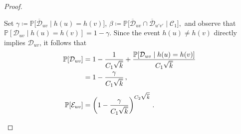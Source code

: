 \documentclass[journal]{IEEEtran}
\theoremstyle{definition}
\theoremstyle{definition}
\newcommand{\Dc}{\mathcal{D}}
\newcommand{\Ec}{\mathcal{E}}
\newcommand{\PP}{\mathbb{P}}
\newcommand{\kb}{\overline{k}}
\newcommand{\barD}{\overline{\mathcal{D}}}
\begin{document}
\begin{proof}
\begin{enumerate}
        Set $\gamma \coloneqq \PP\bigl[\barD_{uv} \mid h(u) = h(v)\bigr]$, $\beta \coloneqq \PP\bigl[\barD_{uv} \cap \barD_{u'v'} \mid \mathcal{C}_1\bigr],$
and observe that $\PP[\Dc_{uv} \mid h(u) = h(v)] = 1 - \gamma$.
        Since the event $h(u) \ne h(v)$ directly implies $\Dc_{uv}$, it follows that
\begin{align}
    \PP[\Dc_{uv}] 
    &= 1 - \frac{1}{C_1 \sqrt{\kb}} 
       + \frac{\PP[\Dc_{uv} \mid h(u) = h(v)] }{C_1 \sqrt{\kb}} \notag \\
    &= 1 - \frac{\gamma}{C_1 \sqrt{\kb}}\, ,  
    \label{eq:lem_cova_D_uv} \\[4pt]
    \PP[\Ec_{uv}] 
    &= \left(1 - \frac{\gamma}{C_1 \sqrt{\kb}} \right)^{C_2 \sqrt{\kb}} \,.
    \label{eq:lem_cova_E_uv}
\end{align}
        

\end{enumerate}
\end{proof}
\end{document}

